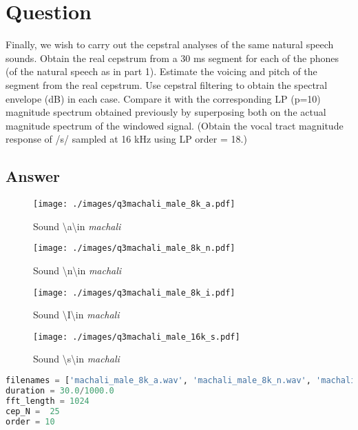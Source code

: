 \documentclass[a4paper]{article}
\begin{document}
\section{Question}
Finally, we wish to carry out the cepstral analyses of the same natural speech sounds. Obtain the real cepstrum from a 30 ms segment for each of the phones (of the natural speech as in part 1). Estimate the voicing and pitch of the segment from the real cepstrum. Use cepstral filtering to obtain the spectral envelope (dB) in each case. Compare it with the corresponding LP (p=10) magnitude spectrum obtained previously by superposing both on the actual magnitude spectrum of the windowed signal. (Obtain the vocal tract magnitude response of /s/ sampled at 16 kHz using LP order = 18.)


\subsection{Answer}

\begin{figure}[h!]
    \texttt{[image: ./images/q3machali\_male\_8k\_a.pdf]}
    \caption{Sound \textbackslash a\textbackslash in \textit{machali}}
    \label{fig:1}
\end{figure}

\begin{figure}[h!]
    \texttt{[image: ./images/q3machali\_male\_8k\_n.pdf]}
    \caption{Sound \textbackslash n\textbackslash in \textit{machali}}
    \label{fig:1}
\end{figure}

\begin{figure}[h!]
    \texttt{[image: ./images/q3machali\_male\_8k\_i.pdf]}
    \caption{Sound \textbackslash I\textbackslash in \textit{machali}}
    \label{fig:1}
\end{figure}

\begin{figure}[h!]
    \texttt{[image: ./images/q3machali\_male\_16k\_s.pdf]}
    \caption{Sound \textbackslash s\textbackslash in \textit{machali}}
    \label{fig:1}
\end{figure}



\begin{lstlisting}[language=Python, caption=params.py]
filenames = ['machali_male_8k_a.wav', 'machali_male_8k_n.wav', 'machali_male_8k_i.wav', 'machali_male_16k_s.wav']
duration = 30.0/1000.0
fft_length = 1024
cep_N =  25
order = 10
\end{lstlisting}
\end{document}
